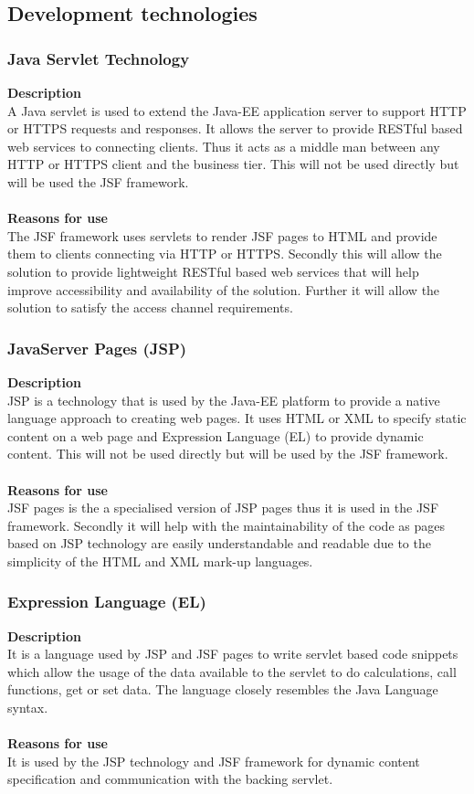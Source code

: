 \documentclass[12pt]{article}
\begin{document}
\subsection{Development technologies}
\subsubsection{Java Servlet Technology}
\textbf{Description}\\
A Java servlet is used to extend the Java-EE application server to support HTTP or HTTPS requests and responses. It allows the server to provide RESTful based web services to connecting clients. Thus it acts as a middle man between any HTTP or HTTPS client and the business tier. This will not be used directly but will be used the JSF framework.\\\\
\textbf{Reasons for use}\\
The JSF framework uses servlets to render JSF pages to HTML and provide them to clients connecting via HTTP or HTTPS. Secondly this will allow the solution to provide lightweight RESTful based web services that will help improve accessibility and availability of the solution. Further it will allow the solution to satisfy the access channel requirements.

\subsubsection{JavaServer Pages (JSP)}
\textbf{Description}\\
JSP is a technology that is used by the Java-EE platform to provide a native language approach to creating web pages. It uses HTML or XML to specify static content on a web page and Expression Language (EL) to provide dynamic content. This will not be used directly but will be used by the JSF framework.\\\\
\textbf{Reasons for use}\\
JSF pages is the a specialised version of JSP pages thus it is used in the JSF framework. Secondly it will help with the maintainability of the code as pages based on JSP technology are easily understandable and readable due to the simplicity of the HTML and XML mark-up languages.    
 
\subsubsection{Expression Language (EL)}
\textbf{Description}\\
It is a language used by JSP and JSF pages to write servlet based code snippets which allow the usage of the data available to the servlet to do calculations, call functions, get or set data. The language closely resembles the Java Language syntax.\\\\
\textbf{Reasons for use}\\
It is used by the JSP technology and JSF framework for dynamic content specification and communication with the backing servlet.
\end{document}
